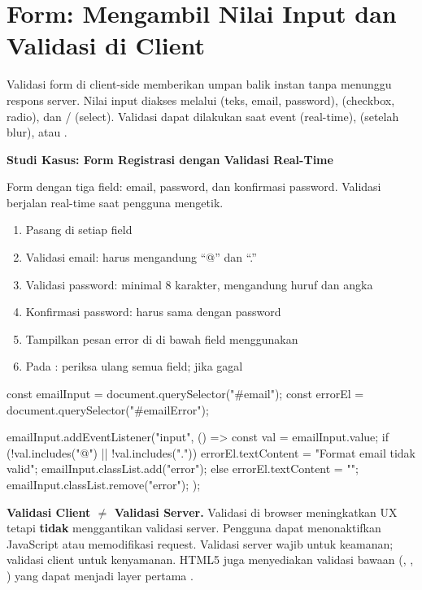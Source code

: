 \section{Form: Mengambil Nilai Input dan Validasi di Client}

Validasi form di client-side memberikan umpan balik instan tanpa menunggu respons server. Nilai input diakses melalui  (teks, email, password),  (checkbox, radio), dan / (select). Validasi dapat dilakukan saat event  (real-time),  (setelah blur), atau  \cite{jsInfo}.

\begin{contoh}
\textbf{Studi Kasus: Form Registrasi dengan Validasi Real-Time}

Form dengan tiga field: email, password, dan konfirmasi password. Validasi berjalan real-time saat pengguna mengetik.
\begin{enumerate}
  \item Pasang  di setiap field
  \item Validasi email: harus mengandung ``@'' dan ``.''
  \item Validasi password: minimal 8 karakter, mengandung huruf dan angka
  \item Konfirmasi password: harus sama dengan password
  \item Tampilkan pesan error di  di bawah field menggunakan 
  \item Pada : periksa ulang semua field;  jika gagal
\end{enumerate}
\end{contoh}

\begin{webcode}[language=JavaScript, caption={Validasi form real-time}]
const emailInput = document.querySelector("#email");
const errorEl = document.querySelector("#emailError");

emailInput.addEventListener("input", () => {
  const val = emailInput.value;
  if (!val.includes("@") || !val.includes(".")) {
    errorEl.textContent = "Format email tidak valid";
    emailInput.classList.add("error");
  } else {
    errorEl.textContent = "";
    emailInput.classList.remove("error");
  }
});
\end{webcode}

\begin{catatan}
\textbf{Validasi Client $\neq$ Validasi Server.} Validasi di browser meningkatkan UX tetapi \textbf{tidak} menggantikan validasi server. Pengguna dapat menonaktifkan JavaScript atau memodifikasi request. Validasi server wajib untuk keamanan; validasi client untuk kenyamanan. HTML5 juga menyediakan validasi bawaan (, , ) yang dapat menjadi layer pertama \cite{mdnAccessibility}.
\end{catatan}

